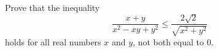 Prove that the inequality \[ \frac{ x+y}{x^2-xy+y^2 } \leq \frac{ 2\sqrt 2 }{\sqrt{ x^2 +y^2 } } \] holds for all real numbers $x$ and $y$, not both equal to 0.